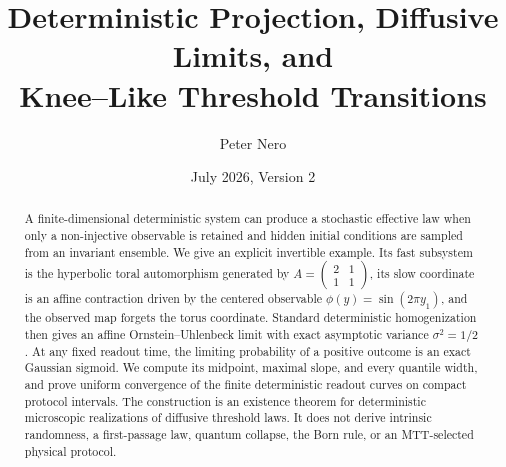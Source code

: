 \documentclass[11pt]{article}
\title{Deterministic Projection, Diffusive Limits, and\\
Knee--Like Threshold Transitions}
\author{Peter Nero}
\date{July 2026, Version 2}
\begin{document}
\maketitle

\begin{abstract}
A finite-dimensional deterministic system can produce a stochastic effective law when only a non-injective observable is retained and hidden initial conditions are sampled from an invariant ensemble. We give an explicit invertible example. Its fast subsystem is the hyperbolic toral automorphism generated by
\(
A=\left(\begin{smallmatrix}2&1\\1&1\end{smallmatrix}\right)
\),
its slow coordinate is an affine contraction driven by the centered observable
\(\phi(y)=\sin(2\pi y_1)\), and the observed map forgets the torus coordinate. Standard deterministic homogenization then gives an affine Ornstein--Uhlenbeck limit with exact asymptotic variance \(\sigma^2=1/2\). At any fixed readout time, the limiting probability of a positive outcome is an exact Gaussian sigmoid. We compute its midpoint, maximal slope, and every quantile width, and prove uniform convergence of the finite deterministic readout curves on compact protocol intervals. The construction is an existence theorem for deterministic microscopic realizations of diffusive threshold laws. It does not derive intrinsic randomness, a first-passage law, quantum collapse, the Born rule, or an MTT-selected physical protocol.
\end{abstract}
\end{document}
